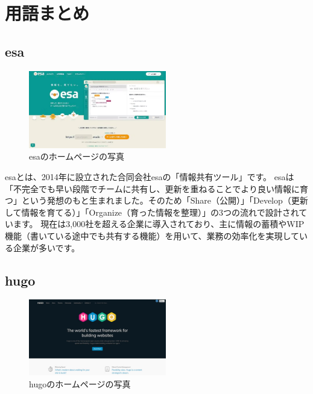 \chapter{用語まとめ}

\section{esa}

  \begin{figure}[H]
    \centering
    \includegraphics[width=6cm]{./image/02-chap3/esa.png}
    \caption{esaのホームページの写真}
    \label{chap3-esa-image}
  \end{figure}


  \begin{tcolorbox}[title=esaとは]
    esaとは、2014年に設立された合同会社esaの「情報共有ツール」です。
    esaは「不完全でも早い段階でチームに共有し、更新を重ねることでより良い情報に育つ」という発想のもと生まれました。そのため「Share（公開）」「Develop（更新して情報を育てる）」「Organize（育った情報を整理）」の3つの流れで設計されています。
    現在は3,000社を超える企業に導入されており、主に情報の蓄積やWIP機能（書いている途中でも共有する機能）を用いて、業務の効率化を実現している企業が多いです。
    \cite{esaとは} \cite{公式esaWeb}

  \end{tcolorbox}

\section{hugo}

  \begin{figure}[H]
    \centering
    \includegraphics[width=6cm]{./image/02-chap3/hugo.png}
    \caption{hugoのホームページの写真}
    \label{chap3-hugo-image}
  \end{figure}

